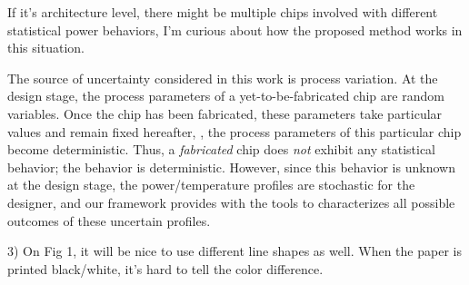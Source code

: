 \begin{reviewer}
[\ldots] If it’s architecture level, there might be multiple chips involved with different statistical power behaviors, I’m curious about how the proposed method works in this situation.
\end{reviewer}
\begin{authors}
The source of uncertainty considered in this work is process variation.
At the design stage, the process parameters of a yet-to-be-fabricated chip are random variables.
Once the chip has been fabricated, these parameters take particular values and remain fixed hereafter, \ie, the process parameters of this particular chip become deterministic.
Thus, a \emph{fabricated} chip does \emph{not} exhibit any statistical behavior; the behavior is deterministic.
However, since this behavior is unknown at the design stage, the power/temperature profiles are stochastic for the designer, and our framework provides with the tools to characterizes all possible outcomes of these uncertain profiles.

\end{authors}

\begin{reviewer}
3) On Fig 1, it will be nice to use different line shapes as well. When the paper is printed black/white, it’s hard to tell the color difference.
\end{reviewer}
\begin{authors}


\end{authors}

